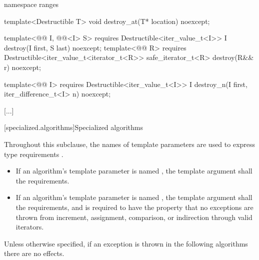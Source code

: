 \begin{addedblock}
\begin{codeblock}
  namespace ranges {
    template<Destructible T>
      void destroy_at(T* location) noexcept;

    template<@@ I, @@<I> S>
        requires Destructible<iter_value_t<I>>
      I destroy(I first, S last) noexcept;
    template<@@ R>
        requires Destructible<iter_value_t<iterator_t<R>>
      safe_iterator_t<R> destroy(R&& r) noexcept;

    template<@@ I>
        requires Destructible<iter_value_t<I>>
      I destroy_n(I first, iter_difference_t<I> n) noexcept;
  }
\end{codeblock}
\end{addedblock}
\begin{codeblock}

  [...]
}
\end{codeblock}

[...]

\setcounter{subsection}{10}
[specialized.algorithms]{Specialized algorithms}

\pnum
Throughout this subclause, the names of template parameters are used to
express type requirements .
\begin{itemize}
\item
If an algorithm's template parameter is named ,
the template argument shall  the
 requirements.
\item
If an algorithm's template parameter is named ,
the template argument shall  the
 requirements, and
is required to have the property that no exceptions are thrown
from increment, assignment, comparison, or indirection through valid iterators.
\end{itemize}

\pnum
Unless otherwise specified,
if an exception is thrown in the following algorithms there are no effects.


